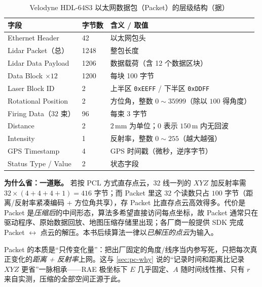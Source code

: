 \begin{table}[H]\centering\small
\caption{Velodyne HDL-64S3 以太网数据包（Packet）的层级结构（据\cite{gao2023slamad}）}
\label{tab:pc-packet}
\begin{tabular}{p{} p{} p{}}
\toprule
字段 & 字节数 & 含义 / 取值 \\
\midrule
Ethernet Header & 42 & 以太网包头 \\
Lidar Packet（总） & 1248 & 整包长度 \\
\;\;Lidar Data Payload & 1206 & 数据载荷（含 12 个数据区块） \\
\;\;\;\;Data Block $\times12$ & 1200 & 每块 100 字节 \\
\;\;\;\;\;\;Laser Block ID & 2 & 上半区 \texttt{0xEEFF} / 下半区 \texttt{0xDDFF} \\
\;\;\;\;\;\;Rotational Position & 2 & 方位角，整数 $0\!\sim\!35999$（除以 $100$ 得角度） \\
\;\;\;\;\;\;Firing Data（$32$ 束） & 96 & 每束 $3$ 字节 \\
\;\;\;\;\;\;\;\;Distance & 2 & $2\,\mathrm{mm}$ 为单位；$0$ 表示 $150\,\mathrm{m}$ 内无回波 \\
\;\;\;\;\;\;\;\;Intensity & 1 & 反射率，整数 $0\!\sim\!255$（越大越强） \\
\;\;GPS Timestamp & 4 & GPS 时间戳（微秒，逆序字节） \\
\;\;Status Type / Value & 2 & 状态字段 \\
\bottomrule
\end{tabular}
\end{table}

\noindent\textbf{为什么省：一道账。} 若按 PCL 方式直存点云，$32$ 线一列的 $XYZ$ 加反射率需 $32\times(4+4+4+1)=416$ 字节；而 Packet 里这 $32$ 个读数只占 $100$ 字节（距离/反射率紧凑编码 + 方位角共享），存 Packet 比直存点云高效得多\cite{gao2023slamad}。代价是 Packet 是\emph{压缩后}的中间形态，算法多希望直接访问每点坐标，故 Packet 通常只在驱动程序、原始数据回放、地图压缩存储里出现；各厂商一般提供 SDK 完成 Packet $\leftrightarrow$ 点云的解压。本书后续算法一律以\emph{已解压的点云}为输入。

\begin{insight}
Packet 的本质是“只传变化量”：把出厂固定的角度/线序当内参写死，只把每次真正变化的\emph{距离 + 反射率}上网。这与 \cref{sec:pc-why} 说的“记录时间和距离比记录 $XYZ$ 更省”一脉相承——RAE 极坐标下 $E$ 几乎固定、$A$ 随时间线性推、只有 $r$ 来自实测，压缩的全部空间正源于此。
\end{insight}

